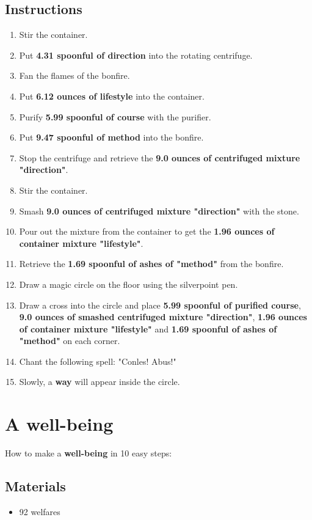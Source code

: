 \documentclass{article}
\begin{document}
\subsection{Instructions}\begin{enumerate}
\item 
Stir the container.
\item 
Put \textbf{4.31 spoonful of direction} into the rotating centrifuge.
\item 
Fan the flames of the bonfire.
\item 
Put \textbf{6.12 ounces of lifestyle} into the container.
\item 
Purify \textbf{5.99 spoonful of course} with the purifier.
\item 
Put \textbf{9.47 spoonful of method} into the bonfire.
\item 
Stop the centrifuge and retrieve the \textbf{9.0 ounces of centrifuged mixture "direction"}.
\item 
Stir the container.
\item 
Smash \textbf{9.0 ounces of centrifuged mixture "direction"} with the stone.
\item 
Pour out the mixture from the container to get the \textbf{1.96 ounces of container mixture "lifestyle"}.
\item 
Retrieve the \textbf{1.69 spoonful of ashes of "method"} from the bonfire.
\item 
Draw a magic circle on the floor using the silverpoint pen.
\item 
Draw a cross into the circle and place \textbf{5.99 spoonful of purified course}, \textbf{9.0 ounces of smashed centrifuged mixture "direction"}, \textbf{1.96 ounces of container mixture "lifestyle"} and \textbf{1.69 spoonful of ashes of "method"} on each corner.
\item 
Chant the following spell: "Conles! Abus!"
\item 
Slowly, a \textbf{way} will appear inside the circle.
\end{enumerate}
\newpage
\section{A well-being}How to make a \textbf{well-being} in 10 easy steps:

\subsection{Materials}\begin{itemize}
\item 
92 welfares
\end{itemize}
\end{document}
